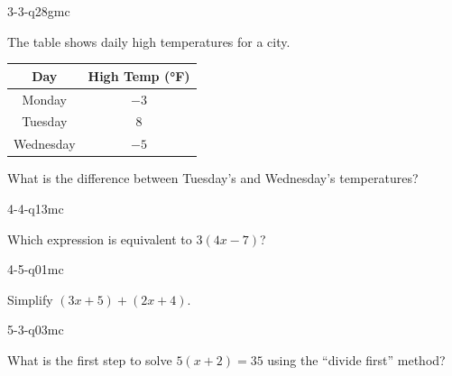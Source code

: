 \begin{practiceQuestion}{3-3-q28}{gmc}
\begin{questionText}
The table shows daily high temperatures for a city.

\begin{center}
\begin{tabular}{|c|c|}
\hline
\textbf{Day} & \textbf{High Temp (°F)} \\
\hline
Monday & $-3$ \\
\hline
Tuesday & $8$ \\
\hline
Wednesday & $-5$ \\
\hline
\end{tabular}
\end{center}

What is the difference between Tuesday's and Wednesday's temperatures?
\end{questionText}
\end{practiceQuestion}

\begin{practiceQuestion}{4-4-q13}{mc}
\begin{questionText}
Which expression is equivalent to $3(4x - 7)$?
\end{questionText}
\end{practiceQuestion}

\begin{practiceQuestion}{4-5-q01}{mc}
\begin{questionText}
Simplify $(3x + 5) + (2x + 4)$.
\end{questionText}
\end{practiceQuestion}

\begin{practiceQuestion}{5-3-q03}{mc}
\begin{questionText}
What is the first step to solve $5(x + 2) = 35$ using the ``divide first'' method?
\end{questionText}
\end{practiceQuestion}

